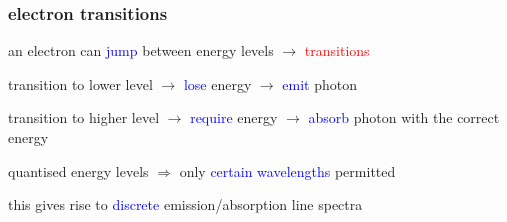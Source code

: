 \documentclass[12pt,xcolor=svgnames,handout]{beamer}
\newcommand{\keypoint}[1]{%
   \textcolor{red}{#1}%
}
\newcommand{\tightframetitle}[1]{ %
\frametitle{#1}\vspace{-.6\baselineskip}}
\begin{document}
\begin{frame}
	\tightframetitle{electron transitions}
	
	\begin{block}{}
		an electron can \textcolor{blue}{jump} between energy levels $\longrightarrow$ \keypoint{transitions}
	\end{block}
	
	\pause
	
	\begin{block}{}
		transition to lower level $\rightarrow$ \textcolor{blue}{lose} energy $\rightarrow$ \textcolor{blue}{emit} photon
		
		transition to higher level $\rightarrow$ \textcolor{blue}{require} energy $\rightarrow$ \textcolor{blue}{absorb} photon with the correct energy
	\end{block}
	
	\pause
	
	\begin{block}{}
		quantised energy levels $\Rightarrow$ only \textcolor{blue}{certain wavelengths} permitted
		
		this gives rise to \textcolor{blue}{discrete} emission/absorption line spectra
	\end{block}
	
\end{frame}
\end{document}
